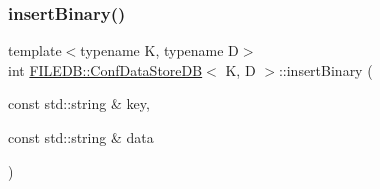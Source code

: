 \subsubsection{\texorpdfstring{insertBinary()}{insertBinary()}\hspace{0.1cm}{\footnotesize\ttfamily [3/3]}}
{\footnotesize\ttfamily template$<$typename K, typename D$>$ \\
int \mbox{\hyperlink{classFILEDB_1_1ConfDataStoreDB}{F\+I\+L\+E\+D\+B\+::\+Conf\+Data\+Store\+DB}}$<$ K, D $>$\+::insert\+Binary (\begin{DoxyParamCaption}\item[{const std\+::string \&}]{key,  }\item[{const std\+::string \&}]{data }\end{DoxyParamCaption})\hspace{0.3cm}{\ttfamily [inline]}}

